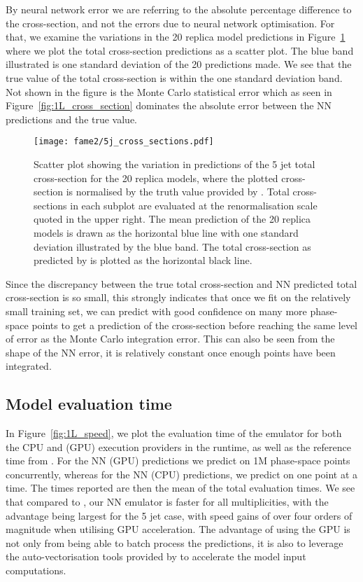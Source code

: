 \documentclass[main.tex]{subfiles}
\begin{document}
By neural network error we are referring to the absolute percentage
difference to the cross-section, and not the errors due to neural
network optimisation. For that, we examine the variations in the 20
replica model predictions in Figure~\ref{fig:1L_5j_cs} where we plot the
total cross-section predictions as a scatter plot. The blue band
illustrated is one standard deviation of the 20 predictions made.
We see that the true value of the total cross-section is within
the one standard deviation band. Not shown in the figure is the
Monte Carlo statistical error which as seen in Figure~\ref{fig:1L_cross_section}
dominates the absolute error between the NN predictions and
the true value.

\begin{figure}
    \texttt{[image: fame2/5j\_cross\_sections.pdf]}
    \caption{Scatter plot showing the variation in predictions of
    the 5 jet total cross-section for the 20 replica models, where
    the plotted cross-section is normalised by the truth value
    provided by {\MadGraph}.
    Total cross-sections in each subplot are evaluated at the
    renormalisation scale quoted in the upper right.
    The mean prediction of the 20 replica models is drawn as the horizontal
    blue line with one standard deviation illustrated by the blue band.
    The total cross-section as predicted by {\MadGraph} is plotted
    as the horizontal black line.}
    \label{fig:1L_5j_cs}
\end{figure}

Since the discrepancy between the true total
cross-section and NN predicted total cross-section is so small,
this strongly indicates that once we fit on the relatively small
training set, we can predict with good confidence on many more
phase-space points to get a prediction of the cross-section before
reaching the same level of error as the Monte Carlo integration error.
This can also be seen from the shape of the NN error, it is relatively
constant once enough points have been integrated.

\subsection{Model evaluation time}
In Figure~\ref{fig:1L_speed}, we plot the evaluation time of the emulator
for both the CPU and {\CUDA} (GPU) execution providers in the {\ONNX} runtime,
as well as the reference time from {\MadGraph}. For the NN (GPU)
predictions we predict on 1M phase-space points concurrently, whereas
for the NN (CPU) predictions, we predict on one point at a time.
The times reported are then the mean of the total evaluation times.
We see that compared to {\MadGraph}, our NN emulator
is faster for all multiplicities, with the advantage being largest
for the 5 jet case, with speed gains of over four orders of magnitude
when utilising GPU acceleration. The advantage of using the GPU is
not only from being able to batch process the predictions, it is
also to leverage the auto-vectorisation tools provided
by {\TensorFlow} to accelerate the model input computations.
\end{document}
